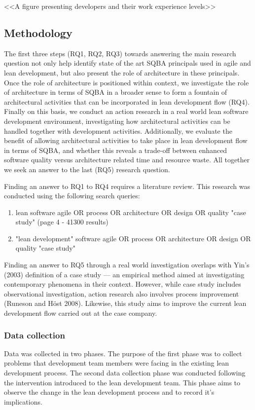 \documentclass[english,12pt,a4paper,pdftex,sci,utf8]{aaltothesis}
\begin{document}
<<A figure presenting developers and their work experience levels>>

\subsection{Methodology} \label{methodology}
The first three steps (RQ1, RQ2, RQ3) towards answering the main research question not only help identify state of the art SQBA principals used in agile and lean development, but also present the role of architecture in these principals. Once the role of architecture is positioned within context, we investigate the role of architecture in terms of SQBA in a broader sense to form a fountain of architectural activities that can be incorporated in lean development flow (RQ4). Finally on this basis, we conduct an action research in a real world lean software development environment, investigating how architectural activities can be handled together with development activities. Additionally, we evaluate the benefit of allowing architectural activities to take place in lean development flow in terms of SQBA, and whether this reveals a trade-off between enhanced software quality versus architecture related time and resource waste. All together we seek an answer to the last (RQ5) research question. 

Finding an answer to RQ1 to RQ4 requires a literature review. This research was conducted using the following search queries:
\begin{enumerate}[label=\textbf{Q1\arabic*}]
\item lean software agile OR process OR architecture OR design OR quality "case study" (page 4 - 41300 results)
\item "lean development" software agile OR process OR architecture OR design OR quality "case study"
\end{enumerate}

Finding an answer to RQ5 through a real world investigation overlaps with Yin's (2003) definition of a case study --- an empirical method aimed at investigating contemporary phenomena in their context. However, while case study includes observational investigation, action research also involves process improvement (Runeson and Höst 2008). Likewise, this study aims to improve the current lean development flow carried out at the case company. 

\subsubsection{Data collection} \label{data collection}
Data was collected in two phases. The purpose of the first phase was to collect problems that development team members were facing in the existing lean development process. The second data collection phase was conducted following the intervention introduced to the lean development team. This phase aims to observe the change in the lean development process and to record it's implications.
\end{document}
